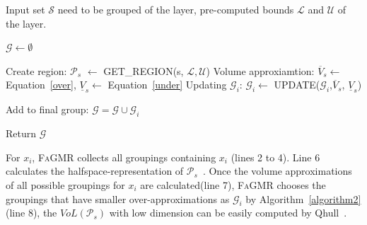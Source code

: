 \documentclass[runningheads]{llncs}
\newcommand{\ourtool}{\textsc{FaGMR}\xspace}
\begin{document}
\begin{algorithm}[!h]
   \caption{\ourtool Grouping Strategy for a Layer}
   \label{algorithm1} 
\begin{algorithmic}[1]
    Input set $\mathcal{S}$ need to be grouped of the layer,
 pre-computed bounds $\mathcal{L}$ and $\mathcal{U}$ of the layer.


   \STATE  $\mathcal{G} \leftarrow \emptyset$

	
   \STATE Create region: $\mathcal{P}_{s}$ $\leftarrow$ GET\_REGION(s, $\mathcal{L}, \mathcal{U}$)
   \STATE Volume approxiamtion: $\overline{V}_{s} \leftarrow$ Equation~\ref{over}, $\underline{V}_{s} \leftarrow$ Equation~\ref{under}
   \STATE Updating $\mathcal{G}_{i}$: $\mathcal{G}_{i} \leftarrow$ UPDATE($\mathcal{G}_{i}$,$\overline{V}_{s}$, $\underline{V}_{s}$)  

   \ENDIF

   
	
   \STATE Add to final group: $\mathcal{G} = \mathcal{G} \cup \mathcal{G}_{i}$

   \ENDIF

   \ENDFOR
   \ENDFOR
   \STATE Return $\mathcal{G}$
\end{algorithmic}
\end{algorithm}
For $x_{i}$, \ourtool collects all groupings containing $x_{i}$ (lines 2 to 4).
Line 6 calculates the halfspace-representation of $\mathcal{P}_{s}$~\cite{gaubert2011minimal}. 
Once the volume approximations of all possible groupings for $x_{i}$ are calculated(line 7),
\ourtool chooses the groupings that have smaller over-approximations as $\mathcal{G}_{i}$ by Algorithm~\ref{algorithm2}(line 8),
the $VoL(\mathcal{P}_{s})$ with low dimension can be easily computed by Qhull~\cite{barber2013qhull}. 
\end{document}
